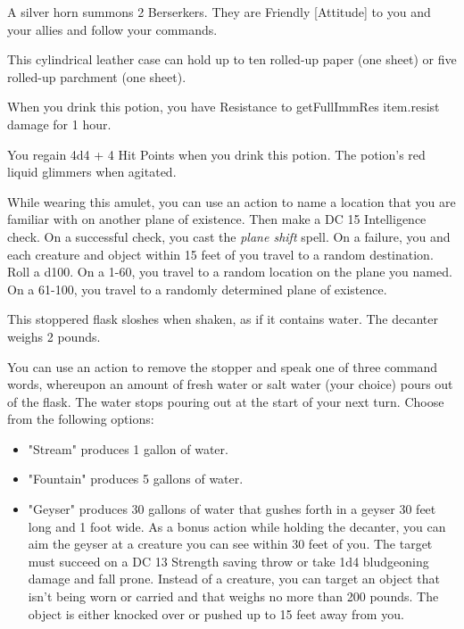 \documentclass[10pt,a4paper,twoside,bg=print,twocolumn,openany,nodeprecatedcode]{dndarticle}
\begin{document}
A silver horn summons 2 Berserkers. They are Friendly [Attitude] to you and your allies and follow your commands.

This cylindrical leather case can hold up to ten rolled-up paper (one sheet) or five rolled-up parchment (one sheet).

When you drink this potion, you have Resistance to {{getFullImmRes item.resist}} damage for 1 hour.

You regain 4d4 + 4 Hit Points when you drink this potion. The potion's red liquid glimmers when agitated.

While wearing this amulet, you can use an action to name a location that you are familiar with on another plane of existence. Then make a DC 15 Intelligence check. On a successful check, you cast the \textit{plane shift} spell. On a failure, you and each creature and object within 15 feet of you travel to a random destination. Roll a d100. On a 1-60, you travel to a random location on the plane you named. On a 61-100, you travel to a randomly determined plane of existence.

This stoppered flask sloshes when shaken, as if it contains water. The decanter weighs 2 pounds.

You can use an action to remove the stopper and speak one of three command words, whereupon an amount of fresh water or salt water (your choice) pours out of the flask. The water stops pouring out at the start of your next turn. Choose from the following options:


\begin{itemize}
\item "Stream" produces 1 gallon of water.
\item "Fountain" produces 5 gallons of water.
\item "Geyser" produces 30 gallons of water that gushes forth in a geyser 30 feet long and 1 foot wide. As a bonus action while holding the decanter, you can aim the geyser at a creature you can see within 30 feet of you. The target must succeed on a DC 13 Strength saving throw or take 1d4 bludgeoning damage and fall prone. Instead of a creature, you can target an object that isn't being worn or carried and that weighs no more than 200 pounds. The object is either knocked over or pushed up to 15 feet away from you.
\end{itemize}
\end{document}
